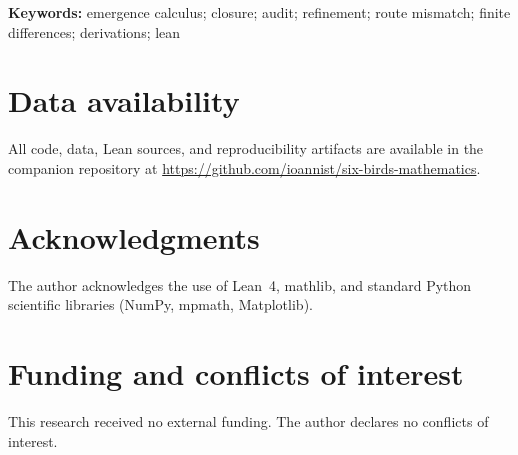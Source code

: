 \documentclass[11pt]{article}
\begin{document}
\vspace{1ex}
\noindent\textbf{Keywords:} emergence calculus; closure; audit; refinement; route mismatch; finite differences; derivations; lean











\section*{Data availability}
All code, data, Lean sources, and reproducibility artifacts are available in the companion repository at \url{https://github.com/ioannist/six-birds-mathematics}.

\section*{Acknowledgments}
The author acknowledges the use of Lean~4, mathlib, and standard Python scientific libraries (NumPy, mpmath, Matplotlib).

\section*{Funding and conflicts of interest}
This research received no external funding. The author declares no conflicts of interest.




\appendix


\end{document}
